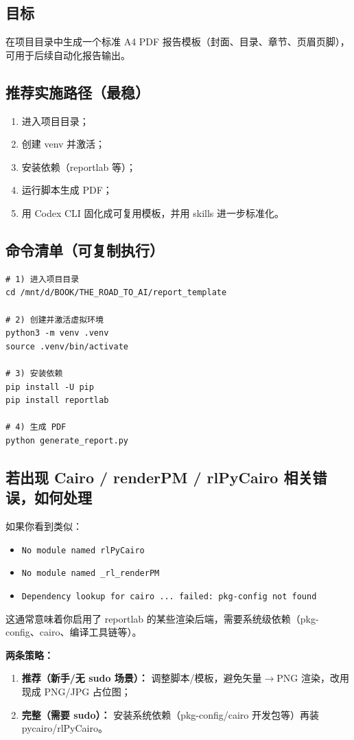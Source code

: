 \documentclass[11pt,a4paper]{article}
\begin{document}
\subsection{目标}
在项目目录中生成一个标准 A4 PDF 报告模板（封面、目录、章节、页眉页脚），可用于后续自动化报告输出。

\subsection{推荐实施路径（最稳）}
\begin{enumerate}[leftmargin=1.7em]
  \item 进入项目目录；
  \item 创建 venv 并激活；
  \item 安装依赖（reportlab 等）；
  \item 运行脚本生成 PDF；
  \item 用 Codex CLI 固化成可复用模板，并用 skills 进一步标准化。
\end{enumerate}

\subsection{命令清单（可复制执行）}
\begin{lstlisting}
# 1) 进入项目目录
cd /mnt/d/BOOK/THE_ROAD_TO_AI/report_template

# 2) 创建并激活虚拟环境
python3 -m venv .venv
source .venv/bin/activate

# 3) 安装依赖
pip install -U pip
pip install reportlab

# 4) 生成 PDF
python generate_report.py
\end{lstlisting}

\subsection{若出现 Cairo / renderPM / rlPyCairo 相关错误，如何处理}
如果你看到类似：
\begin{itemize}[leftmargin=1.5em]
  \item \texttt{No module named rlPyCairo}
  \item \texttt{No module named \_rl\_renderPM}
  \item \texttt{Dependency lookup for cairo ... failed: pkg-config not found}
\end{itemize}
这通常意味着你启用了 reportlab 的某些渲染后端，需要系统级依赖（pkg-config、cairo、编译工具链等）。

\textbf{两条策略：}
\begin{enumerate}[leftmargin=1.7em]
  \item \textbf{推荐（新手/无 sudo 场景）：} 调整脚本/模板，避免矢量$\rightarrow$PNG 渲染，改用现成 PNG/JPG 占位图；
  \item \textbf{完整（需要 sudo）：} 安装系统依赖（pkg-config/cairo 开发包等）再装 pycairo/rlPyCairo。
\end{enumerate}
\end{document}
